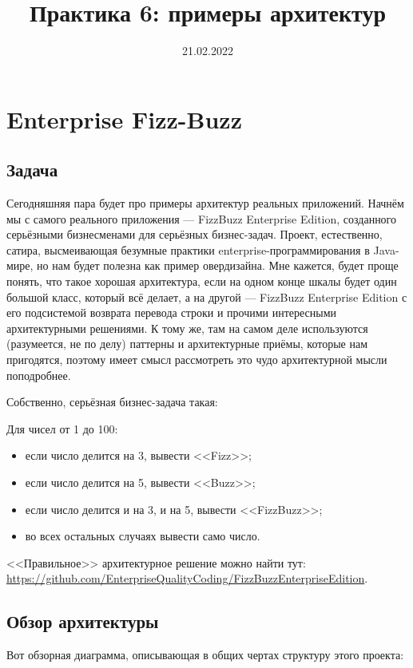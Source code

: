 \documentclass[a5paper]{article}
\title{Практика 6: примеры архитектур}
\date{21.02.2022}
\begin{document}
\maketitle
\thispagestyle{empty}

\section{Enterprise Fizz-Buzz}

\subsection{Задача}

Сегодняшняя пара будет про примеры архитектур реальных приложений. Начнём мы с самого реального приложения --- FizzBuzz Enterprise Edition, созданного серьёзными бизнесменами для серьёзных бизнес-задач. Проект, естественно, сатира, высмеивающая безумные практики enterprise-программирования в Java-мире, но нам будет полезна как пример овердизайна. Мне кажется, будет проще понять, что такое хорошая архитектура, если на одном конце шкалы будет один большой класс, который всё делает, а на другой --- FizzBuzz Enterprise Edition с его подсистемой возврата перевода строки и прочими интересными архитектурными решениями. К тому же, там на самом деле используются (разумеется, не по делу) паттерны и архитектурные приёмы, которые нам пригодятся, поэтому имеет смысл рассмотреть это чудо архитектурной мысли поподробнее.

Собственно, серьёзная бизнес-задача такая:

Для чисел от 1 до 100:
\begin{itemize}
    \item если число делится на 3, вывести <<Fizz>>;
    \item если число делится на 5, вывести <<Buzz>>;
    \item если число делится и на 3, и на 5, вывести <<FizzBuzz>>;
    \item во всех остальных случаях вывести само число.
\end{itemize}

<<Правильное>> архитектурное решение можно найти тут: \url{https://github.com/EnterpriseQualityCoding/FizzBuzzEnterpriseEdition}.

\subsection{Обзор архитектуры}

Вот обзорная диаграмма, описывающая в общих чертах структуру этого проекта:
\end{document}

